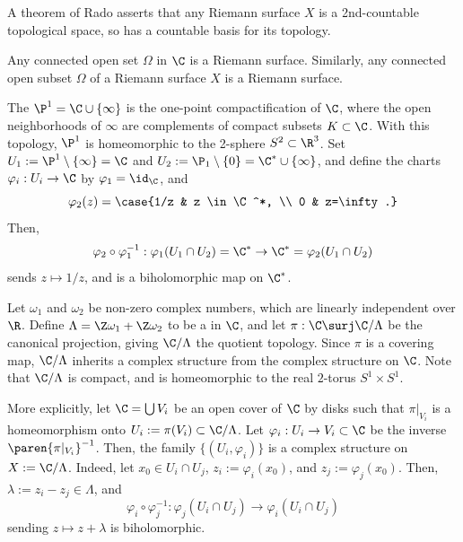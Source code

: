 \documentclass[11pt]{report}
\begin{document}
\begin{rmk}
    A theorem of Rado asserts that any Riemann surface $X$ is a 2nd-countable topological space, so has a countable basis for its topology.
\end{rmk}

\begin{ex}
    Any connected open set $\Omega$ in $\C$ is a Riemann surface. Similarly, any connected open subset $\Omega$ of a Riemann surface $X$ is a Riemann surface.
\end{ex}

\begin{ex}
    The  $\P^1=\C \cup \{\infty\}$ is the one-point compactification of $\C$, where the open neighborhoods of $\infty$ are complements of compact subsets $K \subset \C$. With this topology, $\P^1$ is homeomorphic to the 2-sphere $S^2 \subset \R^3$. Set $U_1 := \P^1\setminus \{\infty \} = \C$ and $U_2:=\P_1\setminus \{0\}=\C^*\cup \{\infty\}$, and define the charts $\varphi_i:U_i\to \C$ by $\varphi_1=\id_\C$, and
    $$\varphi_2(z) = \case{1/z & z \in \C^*, \\ 0 & z=\infty.}$$
    Then,
    $$\varphi_2\circ \varphi_1^{-1}:\varphi_1(U_1\cap U_2) = \C^* \to \C^* = \varphi_2(U_1 \cap U_2)$$
    sends $z \mapsto 1/z$, and is a biholomorphic map on $\C^*$.
\end{ex}

\begin{ex}
    Let $\omega_1$ and $\omega_2$ be non-zero complex numbers, which are linearly independent over $\R$. Define $\Lambda =\Z\omega_1 + \Z\omega_2$ to be a  in $\C$, and let $\pi:\C \surj \C/\Lambda$ be the canonical projection, giving $\C/\Lambda$ the quotient topology. Since $\pi$ is a covering map, $\C/\Lambda$ inherits a complex structure from the complex structure on $\C$. Note that $\C/\Lambda$ is compact, and is homeomorphic to the real $2$-torus $S^1 \times S^1$.

    More explicitly, let $\C = \bigcup V_i$ be an open cover of $\C$ by disks such that $\pi|_{V_i}$ is a homeomorphism onto $U_i := \pi (V_i)\subset \C/\Lambda$. Let $\varphi_i:U_i \to V_i \subset \C$ be the inverse $\paren{\pi|_{V_i}}^{-1}$. Then, the family $\{(U_i,\varphi_i)\}$ is a complex structure on $X := \C/\Lambda$. Indeed, let $x_0 \in U_i \cap U_j$, $z_i:=\varphi_i(x_0)$, and $z_j := \varphi_j(x_0)$. Then, $\lambda:=z_i-z_j \in \Lambda$, and
    $$\varphi_i \circ \varphi_j^{-1}: \varphi_j(U_i \cap U_j) \to \varphi_i(U_i \cap U_j)$$
    sending $z \mapsto z + \lambda$ is biholomorphic.
\end{ex}
\end{document}

